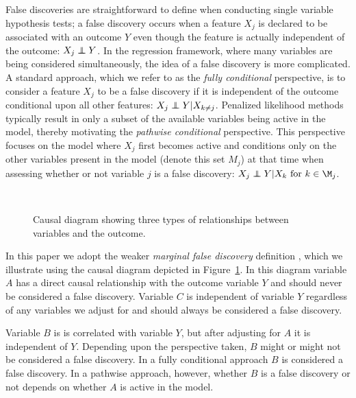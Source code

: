 False discoveries are straightforward to define when conducting single variable hypothesis tests; a false discovery occurs when a feature $X_j$ is declared to be associated with an outcome $Y$ even though the feature is actually independent of the outcome: $X_j \independent Y$. In the regression framework, where many variables are being considered simultaneously, the idea of a false discovery is more complicated. A standard approach, which we refer to as the \textit{fully conditional} perspective, is to consider a feature $X_j$ to be a false discovery if it is independent of the outcome conditional upon all other features: $X_j \independent Y | X_{k \neq j}$. Penalized likelihood methods typically result in only a subset of the available variables being active in the model, thereby motivating the \textit{pathwise conditional} perspective.  This perspective focuses on the model where $X_j$ first becomes active and conditions only on the other variables present in the model (denote this set $M_j$) at that time when assessing whether or not variable $j$ is a false discovery: $X_j \independent Y | X_k \text{ for } k \in \M_j$.

\begin{figure}[!htb]
\centering
{} \\
\caption{\label{Fig:diagram} Causal diagram showing three types of relationships between variables and the outcome.}
\end{figure}

In this paper we adopt the weaker \textit{marginal false discovery} definition \citep{Breheny2016}, which we illustrate using the causal diagram depicted in Figure~\ref{Fig:diagram}. In this diagram variable $A$ has a direct causal relationship with the outcome variable $Y$ and should never be considered a false discovery. Variable $C$ is independent of variable $Y$ regardless of any variables we adjust for and should always be considered a false discovery. 

Variable $B$ is is correlated with variable $Y$, but after adjusting for $A$ it is independent of $Y$. Depending upon the perspective taken, $B$ might or might not be considered a false discovery. In a fully conditional approach $B$ is considered a false discovery.  In a pathwise approach, however, whether $B$ is a false discovery or not depends on whether $A$ is active in the model.

